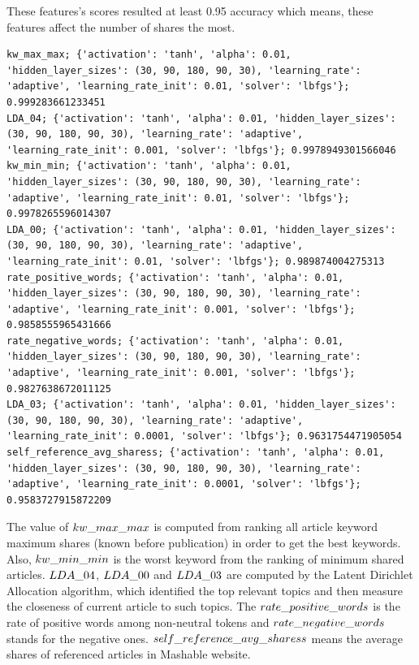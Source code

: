 These features's scores resulted at least 0.95 accuracy which means, these features affect the number of shares the most.
\begin{lstlisting}
kw_max_max; {'activation': 'tanh', 'alpha': 0.01, 'hidden_layer_sizes': (30, 90, 180, 90, 30), 'learning_rate': 'adaptive', 'learning_rate_init': 0.01, 'solver': 'lbfgs'}; 0.999283661233451
LDA_04; {'activation': 'tanh', 'alpha': 0.01, 'hidden_layer_sizes': (30, 90, 180, 90, 30), 'learning_rate': 'adaptive', 'learning_rate_init': 0.001, 'solver': 'lbfgs'}; 0.9978949301566046
kw_min_min; {'activation': 'tanh', 'alpha': 0.01, 'hidden_layer_sizes': (30, 90, 180, 90, 30), 'learning_rate': 'adaptive', 'learning_rate_init': 0.01, 'solver': 'lbfgs'}; 0.9978265596014307
LDA_00; {'activation': 'tanh', 'alpha': 0.01, 'hidden_layer_sizes': (30, 90, 180, 90, 30), 'learning_rate': 'adaptive', 'learning_rate_init': 0.01, 'solver': 'lbfgs'}; 0.989874004275313
rate_positive_words; {'activation': 'tanh', 'alpha': 0.01, 'hidden_layer_sizes': (30, 90, 180, 90, 30), 'learning_rate': 'adaptive', 'learning_rate_init': 0.001, 'solver': 'lbfgs'}; 0.9858555965431666
rate_negative_words; {'activation': 'tanh', 'alpha': 0.01, 'hidden_layer_sizes': (30, 90, 180, 90, 30), 'learning_rate': 'adaptive', 'learning_rate_init': 0.001, 'solver': 'lbfgs'}; 0.9827638672011125
LDA_03; {'activation': 'tanh', 'alpha': 0.01, 'hidden_layer_sizes': (30, 90, 180, 90, 30), 'learning_rate': 'adaptive', 'learning_rate_init': 0.0001, 'solver': 'lbfgs'}; 0.9631754471905054
self_reference_avg_sharess; {'activation': 'tanh', 'alpha': 0.01, 'hidden_layer_sizes': (30, 90, 180, 90, 30), 'learning_rate': 'adaptive', 'learning_rate_init': 0.0001, 'solver': 'lbfgs'}; 0.9583727915872209
\end{lstlisting}
The value of $kw\char`_max\char`_max$ is computed from ranking all article keyword maximum shares (known before publication) in order to get the best keywords. Also, $kw\char`_min\char`_min$ is the worst keyword from the ranking of minimum shared articles. $LDA\char`_04$, $LDA\char`_00$ and $LDA\char`_03$ are computed by the Latent Dirichlet Allocation algorithm, which identified the top relevant topics and then measure the closeness of current article to such topics. The $rate\char`_positive\char`_words$ is the rate of positive words among non-neutral tokens and $rate\char`_negative\char`_words$ stands for the negative ones. $self\char`_reference\char`_avg\char`_sharess$ means the average shares of referenced articles in Mashable website.

